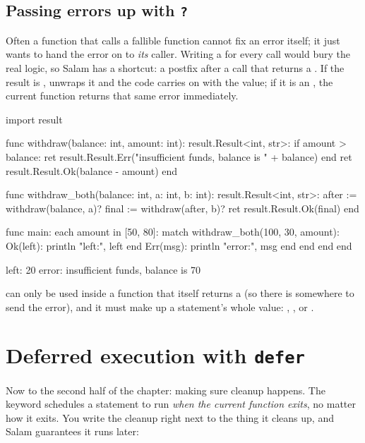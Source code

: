 \subsection{Passing errors up with \texttt{?}}

Often a function that calls a fallible function cannot fix an error itself; it
just wants to hand the error on to \emph{its} caller. Writing a  for
every call would bury the real logic, so Salam has a shortcut: a postfix
 after a call that returns a . If the result is
,  unwraps it and the code carries on with the value; if it is
an , the current function returns that same error immediately.

\begin{salamen}
import result

func withdraw(balance: int, amount: int): result.Result<int, str>:
    if amount > balance:
        ret result.Result.Err("insufficient funds, balance is " + balance)
    end
    ret result.Result.Ok(balance - amount)
end

func withdraw_both(balance: int, a: int, b: int): result.Result<int, str>:
    after := withdraw(balance, a)?
    final := withdraw(after, b)?
    ret result.Result.Ok(final)
end

func main:
    each amount in [50, 80]:
        match withdraw_both(100, 30, amount):
            Ok(left): println "left:", left end
            Err(msg): println "error:", msg end
        end
    end
end
\end{salamen}

\begin{progout}
left: 20
error: insufficient funds, balance is 70
\end{progout}

 can only be used inside a function that itself returns a
 (so there is somewhere to send the error), and it must make up a
statement's whole value: , ,  or
.

\section{Deferred execution with \texttt{defer}}

Now to the second half of the chapter: making sure cleanup happens. The
 keyword schedules a statement to run \emph{when the current function
exits}, no matter how it exits. You write the cleanup right next to the thing it
cleans up, and Salam guarantees it runs later:

